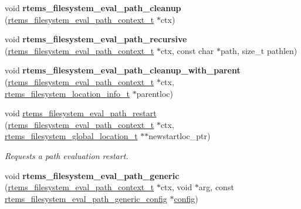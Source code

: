 \begin{DoxyCompactItemize}
\item 
\mbox{\label{group__LibIOInternal_ga9c841545036251245aa9179e04425f2b}} 
void {\bfseries rtems\+\_\+filesystem\+\_\+eval\+\_\+path\+\_\+cleanup} (\mbox{\hyperlink{structrtems__filesystem__eval__path__context__t}{rtems\+\_\+filesystem\+\_\+eval\+\_\+path\+\_\+context\+\_\+t}} $\ast$ctx)
\item 
\mbox{\label{group__LibIOInternal_ga5b33ba89f601f7d22ec22f2d3418f796}} 
void {\bfseries rtems\+\_\+filesystem\+\_\+eval\+\_\+path\+\_\+recursive} (\mbox{\hyperlink{structrtems__filesystem__eval__path__context__t}{rtems\+\_\+filesystem\+\_\+eval\+\_\+path\+\_\+context\+\_\+t}} $\ast$ctx, const char $\ast$path, size\+\_\+t pathlen)
\item 
\mbox{\label{group__LibIOInternal_ga14b05eae1065aa83236d343e7b987431}} 
void {\bfseries rtems\+\_\+filesystem\+\_\+eval\+\_\+path\+\_\+cleanup\+\_\+with\+\_\+parent} (\mbox{\hyperlink{structrtems__filesystem__eval__path__context__t}{rtems\+\_\+filesystem\+\_\+eval\+\_\+path\+\_\+context\+\_\+t}} $\ast$ctx, \mbox{\hyperlink{group__LibIO_ga3252b3d31ee3c49ffff0b7604a676864}{rtems\+\_\+filesystem\+\_\+location\+\_\+info\+\_\+t}} $\ast$parentloc)
\item 
void \mbox{\hyperlink{group__LibIOInternal_ga300dc32a385ff38c7a4d836064593f1d}{rtems\+\_\+filesystem\+\_\+eval\+\_\+path\+\_\+restart}} (\mbox{\hyperlink{structrtems__filesystem__eval__path__context__t}{rtems\+\_\+filesystem\+\_\+eval\+\_\+path\+\_\+context\+\_\+t}} $\ast$ctx, \mbox{\hyperlink{structrtems__filesystem__global__location__t}{rtems\+\_\+filesystem\+\_\+global\+\_\+location\+\_\+t}} $\ast$$\ast$newstartloc\+\_\+ptr)
\begin{DoxyCompactList}\small\item\em Requests a path evaluation restart. \end{DoxyCompactList}\item 
\mbox{\label{group__LibIOInternal_ga8ebebb812533962dae5280318e58d128}} 
void {\bfseries rtems\+\_\+filesystem\+\_\+eval\+\_\+path\+\_\+generic} (\mbox{\hyperlink{structrtems__filesystem__eval__path__context__t}{rtems\+\_\+filesystem\+\_\+eval\+\_\+path\+\_\+context\+\_\+t}} $\ast$ctx, void $\ast$arg, const \mbox{\hyperlink{structrtems__filesystem__eval__path__generic__config}{rtems\+\_\+filesystem\+\_\+eval\+\_\+path\+\_\+generic\+\_\+config}} $\ast$\mbox{\hyperlink{structconfig__s}{config}})
$$
\end{DoxyCompactItemize}
